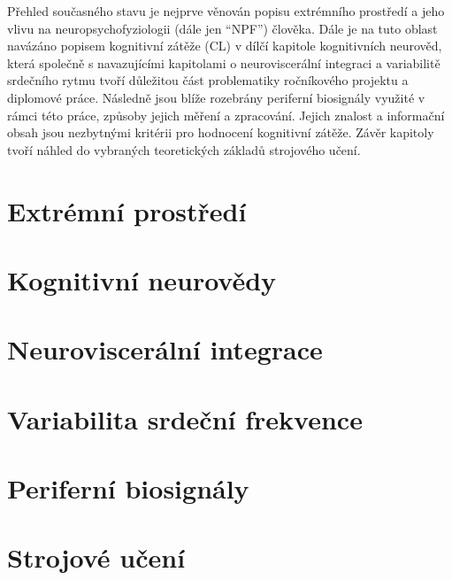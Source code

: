 Přehled současného stavu je nejprve věnován popisu extrémního prostředí a jeho
vlivu na neuropsychofyziologii (dále jen \enquote{\gls{NPF}}) člověka. Dále je
na tuto oblast navázáno popisem kognitivní zátěže (\gls{CL}) v dílčí kapitole
kognitivních neurověd, která společně s navazujícími kapitolami o
neuroviscerální integraci a variabilitě srdečního rytmu tvoří důležitou část
problematiky ročníkového projektu a diplomové práce. Následně jsou blíže
rozebrány periferní biosignály využité v rámci této práce, způsoby jejich měření
a zpracování. Jejich znalost a informační obsah jsou nezbytnými kritérii pro
hodnocení kognitivní zátěže. Závěr kapitoly tvoří náhled do vybraných
teoretických základů strojového učení.

\section{Extrémní prostředí}
\label{sec:extreme_environment}


\section{Kognitivní neurovědy}
\label{sec:cognitive_neuroscience}


\section{Neuroviscerální integrace}
\label{sec:neurovisceralni_integrace}


\section{Variabilita srdeční frekvence}
\label{sec:hrv}


\section{Periferní biosignály}
\label{sec:peripheral_biosignals}


\section{Strojové učení}
\label{sec:machine_learning}
